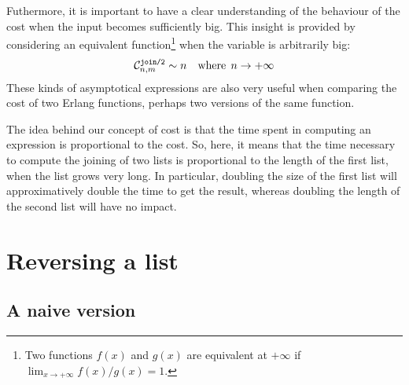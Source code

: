 \documentclass[11pt,a4paper]{article}
\newcommand\comp[2]{{\cal C}_{#2}^{\texttt{#1}}}
\newcommand\Erlang{\textsf{Erlang}\xspace}
\begin{document}
\medskip

\noindent Futhermore, it is important to have a clear understanding of
the behaviour of the cost when the input becomes sufficiently
big. This insight is provided by considering an equivalent
function\footnote{Two functions \(f(x)\) and \(g(x)\) are equivalent
  at \(+\infty\) if \(\lim_{x \rightarrow +\infty}{f(x)/g(x)} = 1\).}
when the variable is arbitrarily big:
\[
\comp{join/2}{n,m} \sim n \quad \text{where} \;\, n \rightarrow
+\infty
\]
These kinds of asymptotical expressions are also very useful when
comparing the cost of two \Erlang functions, perhaps two versions of
the same function.

\medskip

\noindent The idea behind our concept of cost is that the time spent
in computing an expression is proportional to the cost. So, here, it
means that the time necessary to compute the joining of two lists is
proportional to the length of the first list, when the list grows
very long. In particular, doubling the size of the first list will
approximatively double the time to get the result, whereas doubling
the length of the second list will have no impact.

\section{Reversing a list}

\subsection{A naive version}
\label{naive}
\end{document}
